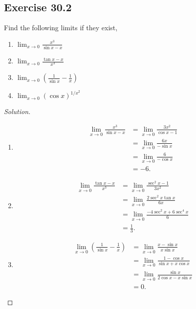 \documentclass{article}
\begin{document}
\newpage
\subsection*{Exercise 30.2}
Find the following limits if they exist,
\begin{enumerate}[label=\textbf{(\alph*)}]
    \item $\lim_{x\to0}\frac{x^3}{\sin x -x}$
    \item $\lim_{x\to0}\frac{\tan x - x}{x^3}$
    \item $\lim_{x\to0}\left(\frac{1}{\sin x}-\frac{1}{x}\right)$
    \item $\lim_{x\to0}(\cos x)^{1/x^2}$
\end{enumerate}
\begin{proof}[Solution]\indent
    \begin{enumerate}[label=\textbf{(\alph*)}]
        \item \begin{align*}
            \lim_{x\to0}\frac{x^3}{\sin x -x} & = \lim_{x\to0}\frac{3x^2}{\cos x -1} \\
            & = \lim_{x\to0}\frac{6x}{-\sin x} \\
            & = \lim_{x\to0}\frac{6}{-\cos x} \\
            & = -6.
        \end{align*}

        \item \begin{align*}
            \lim_{x\to0}\frac{\tan x - x}{x^3} & = \lim_{x\to0}\frac{\sec^2 x - 1}{3x^2} \\
            & = \lim_{x\to0}\frac{2\sec^2 x\tan x}{6x} \\
            & = \lim_{x\to0}\frac{-4\sec^2 x + 6\sec^4 x}{6} \\
            & = \frac{1}{3}.
        \end{align*}

        \item
        \begin{align*}
            \lim_{x\to0}\left(\frac{1}{\sin x}-\frac{1}{x}\right) & = \lim_{x\to0}\frac{x-\sin x}{x\sin x} \\
            & = \lim_{x\to0}\frac{1-\cos x}{\sin x + x\cos x} \\
            & = \lim_{x\to0}\frac{\sin x}{2\cos x -x\sin x} \\
            & = 0.
        \end{align*}


\end{enumerate}
\end{proof}
\end{document}
